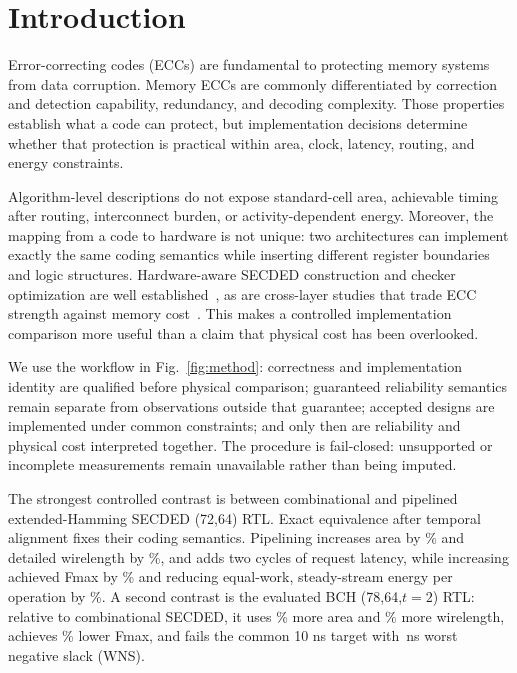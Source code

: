 \section{Introduction}

Error-correcting codes (ECCs) are fundamental to protecting memory systems from data corruption. Memory ECCs are commonly differentiated by correction and detection capability, redundancy, and decoding complexity. Those properties establish what a code can protect, but implementation decisions determine whether that protection is practical within area, clock, latency, routing, and energy constraints.

Algorithm-level descriptions do not expose standard-cell area, achievable timing after routing, interconnect burden, or activity-dependent energy. Moreover, the mapping from a code to hardware is not unique: two architectures can implement exactly the same coding semantics while inserting different register boundaries and logic structures. Hardware-aware SECDED construction and checker optimization are well established~\cite{hsiao1970,ghosh2004,ghosh2005,reviriego2013}, as are cross-layer studies that trade ECC strength against memory cost~\cite{delbel2014,pajouhi2015}. This makes a controlled implementation comparison more useful than a claim that physical cost has been overlooked.

We use the workflow in Fig.~\ref{fig:method}: correctness and implementation identity are qualified before physical comparison; guaranteed reliability semantics remain separate from observations outside that guarantee; accepted designs are implemented under common constraints; and only then are reliability and physical cost interpreted together. The procedure is fail-closed: unsupported or incomplete measurements remain unavailable rather than being imputed.

The strongest controlled contrast is between combinational and pipelined extended-Hamming SECDED (72,64) RTL. Exact equivalence after temporal alignment fixes their coding semantics. Pipelining increases area by \SecAreaPct\% and detailed wirelength by \SecWirePct\%, and adds two cycles of request latency, while increasing achieved Fmax by \SecFmaxPct\% and reducing equal-work, steady-stream energy per operation by \SecEnergyReductionPct\%. A second contrast is the evaluated BCH (78,64,$t=2$) RTL: relative to combinational SECDED, it uses \BchAreaPct\% more area and \BchWirePct\% more wirelength, achieves \BchFmaxReductionPct\% lower Fmax, and fails the common 10 ns target with \BchWns\,ns worst negative slack (WNS).

